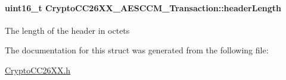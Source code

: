 \paragraph[{header\+Length}]{\setlength{\rightskip}{0pt plus 5cm}uint16\+\_\+t Crypto\+C\+C26\+X\+X\+\_\+\+A\+E\+S\+C\+C\+M\+\_\+\+Transaction\+::header\+Length}\label{struct_crypto_c_c26_x_x___a_e_s_c_c_m___transaction_a28e4d04c356e342908588e19011a0e5d}
The length of the header in octets 

The documentation for this struct was generated from the following file\+:\begin{DoxyCompactItemize}
\item 
\hyperlink{_crypto_c_c26_x_x_8h}{Crypto\+C\+C26\+X\+X.\+h}\end{DoxyCompactItemize}
